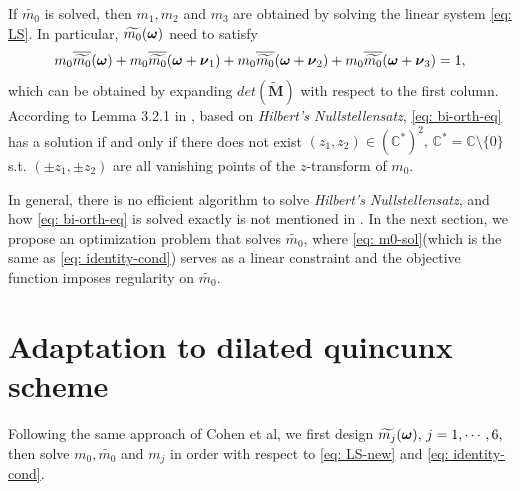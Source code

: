 If $\widetilde{m_0}$ is solved, then $m_1,m_2$ and $m_3$ are obtained by solving the linear system \eqref{eq: LS}.
In particular, $\widetilde{m_{0}}(\boldsymbol{\omega})$ need to satisfy 
\begin{align}\label{eq: bi-orth-eq}
m_0\overline{\widetilde{m_{0}}}(\boldsymbol{\omega}) + m_0\overline{\widetilde{m_{0}}}(\boldsymbol{\omega} + \boldsymbol{\nu}_{1}) + m_0\overline{\widetilde{m_{0}}}(\boldsymbol{\omega} + \boldsymbol{\nu}_{2}) + m_0\overline{\widetilde{m_{0}}}(\boldsymbol{\omega} + \boldsymbol{\nu}_{3}) = 1,
\end{align}
which can be obtained by expanding $det(\widetilde{\mathbf{M}})$ with respect to the first column.
According to Lemma 3.2.1 in \cite{cohen1993compactly}, based on {\it Hilbert's Nullstellensatz}, \eqref{eq: bi-orth-eq} has a solution if and only if there does not exist $(z_1,z_2)\in (\mathbb{C}^*)^2,\, \mathbb{C}^* = \mathbb{C}\setminus\{0\}$\, s.t. $(\pm z_1,\pm z_2)$ are all 
vanishing points of the $z$-transform of $m_0$.

In general, there is no efficient algorithm to solve {\it Hilbert's Nullstellensatz}, and how \eqref{eq: bi-orth-eq} is solved exactly is not mentioned in \cite{cohen1993compactly}.
In the next section, we propose an optimization problem that solves $\widetilde{m_0}$, where \eqref{eq: m0-sol}(which is the same as \eqref{eq: identity-cond}) serves as a linear constraint and the objective function imposes regularity on $\widetilde{m_0}$.


\section{Adaptation to dilated quincunx scheme}\label{sec: solve-quincunx}

Following the same approach of Cohen et al, we first design $\widetilde{m_{j}}(\boldsymbol{\omega}),\,j = 1,\cdots,6,$ then solve $m_0,\widetilde{m_0}$ and $m_j$ in order with respect to \eqref{eq: LS-new} and \eqref{eq: identity-cond}.

